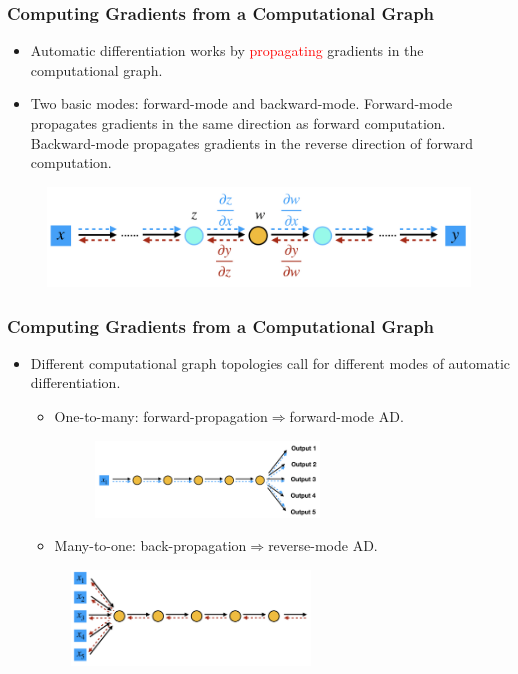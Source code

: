 \documentclass{beamer}
\begin{document}
\begin{frame}
	\frametitle{Computing Gradients from a Computational Graph}
	\begin{itemize}
		\item Automatic differentiation works by \textcolor{red}{propagating} gradients in the computational graph. 
		\item Two basic modes: forward-mode and backward-mode. Forward-mode propagates gradients in the same direction as forward computation. Backward-mode propagates gradients in the reverse direction of forward computation. 
		\end{itemize}
		\begin{figure}[hbt]
		\centering
  \includegraphics[width=1.0\textwidth]{figures/fb}
\end{figure}

\end{frame}


\begin{frame}
\frametitle{Computing Gradients from a Computational Graph}
	\begin{itemize}
	\item Different computational graph topologies call for different modes of automatic differentiation. 
		\begin{itemize}
		\item One-to-many: forward-propagation$\Rightarrow$forward-mode AD. 
		\begin{figure}[hbt]
  \includegraphics[width=0.6\textwidth]{figures/onetomany}
\end{figure}
		\item Many-to-one: back-propagation$\Rightarrow$reverse-mode AD.
			\end{itemize}
	\begin{figure}[hbt]
  \includegraphics[width=0.6\textwidth]{figures/manytoone}
\end{figure}
  \end{itemize} 

\end{frame}
\end{document}

